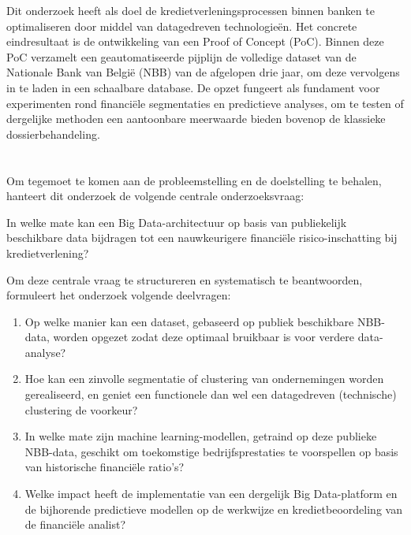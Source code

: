 Dit onderzoek heeft als doel de kredietverleningsprocessen binnen banken te optimaliseren door middel van datagedreven technologieën. Het concrete eindresultaat is de ontwikkeling van een Proof of Concept (PoC). Binnen deze PoC verzamelt een geautomatiseerde pijplijn de volledige dataset van de Nationale Bank van België (NBB) van de afgelopen drie jaar, om deze vervolgens in te laden in een schaalbare database. De opzet fungeert als fundament voor experimenten rond financiële segmentaties en predictieve analyses, om te testen of dergelijke methoden een aantoonbare meerwaarde bieden bovenop de klassieke dossierbehandeling.

\section{}%
\label{sec:onderzoeksvraag}

Om tegemoet te komen aan de probleemstelling en de doelstelling te behalen, hanteert dit onderzoek de volgende centrale onderzoeksvraag:

\begin{displayquote}
    In welke mate kan een Big Data-architectuur op basis van publiekelijk beschikbare data bijdragen tot een nauwkeurigere financiële risico-inschatting bij kredietverlening?
\end{displayquote}

Om deze centrale vraag te structureren en systematisch te beantwoorden, formuleert het onderzoek volgende deelvragen:
\begin{enumerate}
    \item Op welke manier kan een dataset, gebaseerd op publiek beschikbare NBB-data, worden opgezet zodat deze optimaal bruikbaar is voor verdere data-analyse?
    \item Hoe kan een zinvolle segmentatie of clustering van ondernemingen worden gerealiseerd, en geniet een functionele dan wel een datagedreven (technische) clustering de voorkeur?
    \item In welke mate zijn machine learning-modellen, getraind op deze publieke NBB-data, geschikt om toekomstige bedrijfsprestaties te voorspellen op basis van historische financiële ratio's?
    \item Welke impact heeft de implementatie van een dergelijk Big Data-platform en de bijhorende predictieve modellen op de werkwijze en kredietbeoordeling van de financiële analist?
\end{enumerate}

